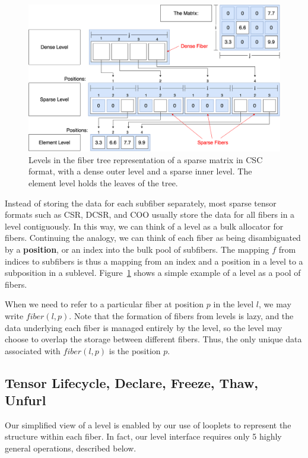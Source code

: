 \begin{figure}
    \centering
    \includegraphics[width=\linewidth]{LevelsVsFibers-matrix.png}
    \caption{Levels in the fiber tree representation of a sparse matrix in CSC format, with a dense outer level and a sparse inner level. The element level holds the leaves of the tree.}
    \label{fig:levelsvsfibers}
\end{figure}

Instead of storing the data for each subfiber separately, most sparse tensor
formats such as CSR, DCSR, and COO usually store the data for all fibers in a
level contiguously. In this way, we can think of a level as a bulk allocator for
fibers. Continuing the analogy, we can think of each fiber as being
disambiguated by a \textbf{position}, or an index into the bulk pool of
subfibers. The mapping $f$ from indices to subfibers is thus a mapping from an
index and a position in a level to a subposition in a sublevel.
Figure~\ref{fig:levelsvsfibers} shows a simple example of a level as a pool of fibers.

When we need to refer to a particular fiber at position $p$ in the level $l$, we
may write $fiber(l, p)$. Note that the formation of fibers from levels is lazy,
and the data underlying each fiber is managed entirely by the level, so the
level may choose to overlap the storage between different fibers. Thus, the only
unique data associated with $fiber(l, p)$ is the position $p$.

\subsection{Tensor Lifecycle, Declare, Freeze, Thaw, Unfurl}

Our simplified view of a level is enabled by our use of looplets to represent
the structure within each fiber.
%
In fact, our level interface requires only 5
highly general operations, described below.

